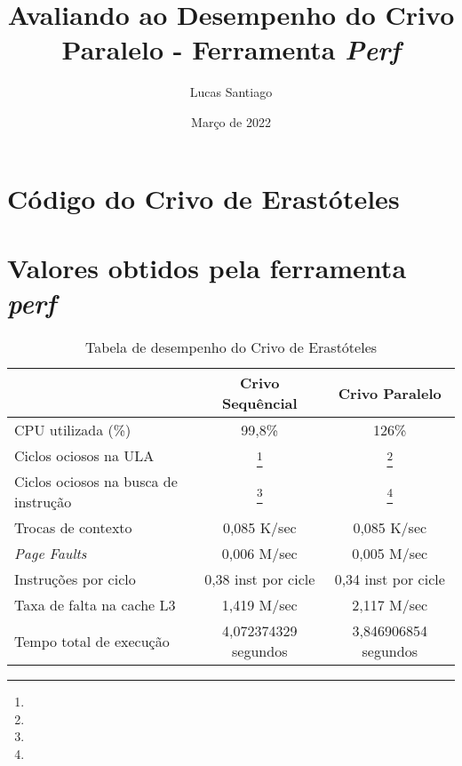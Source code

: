 \documentclass{article}
\title{Avaliando ao Desempenho do Crivo Paralelo - Ferramenta \emph{Perf}}
\author{Lucas Santiago}
\date{Março de 2022}
\begin{document}
\maketitle

    \vspace{2cm}

    \section*{Código do Crivo de Erastóteles}
    

    
    \newpage
    \section*{Valores obtidos pela ferramenta \emph{perf}}
    \begin{table}[ht]
        \centering
        \begin{tabular}{|m{4cm}|c|c|}
            \hline
            & Crivo Sequêncial & Crivo Paralelo \\
            \hline
            CPU utilizada (\%) & 99,8\% & 126\% \\
            \hline
            Ciclos ociosos na ULA & \footnote[1]{} & \footnote[1]{} \\
            \hline
            Ciclos ociosos na busca de instrução & \footnote[1]{} & \footnote[1]{} \\
            \hline
            Trocas de contexto & 0,085 K/sec & 0,085 K/sec \\
            \hline
            
            \emph{Page Faults} & 0,006 M/sec & 0,005 M/sec \\
            \hline
            
            Instruções por ciclo & 0,38 inst por cicle & 0,34 inst por cicle \\
            \hline
            Taxa de falta na cache L3 & 1,419 M/sec & 2,117 M/sec \\
            \hline
            Tempo total de execução & 4,072374329 segundos & 3,846906854 segundos \\
            \hline
        \end{tabular}
        \caption{Tabela de desempenho do Crivo de Erastóteles}
    \end{table}
    
\end{document}
